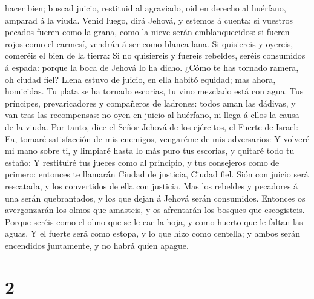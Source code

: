 hacer bien; buscad juicio, restituid al agraviado, oid en derecho al
huérfano, amparad á la viuda.  Venid luego, dirá Jehová,
y estemos á cuenta: si vuestros pecados fueren como la grana, como la
nieve serán emblanquecidos: si fueren rojos como el carmesí, vendrán á
ser como blanca lana.  Si quisiereis y oyereis, comeréis
el bien de la tierra:  Si no quisiereis y fuereis
rebeldes, seréis consumidos á espada: porque la boca de Jehová lo ha
dicho.  ¿Cómo te has tornado ramera, oh ciudad fiel?
Llena estuvo de juicio, en ella habitó equidad; mas ahora, homicidas.
 Tu plata se ha tornado escorias, tu vino mezclado está
con agua.  Tus príncipes, prevaricadores y compañeros de
ladrones: todos aman las dádivas, y van tras las recompensas: no oyen en
juicio al huérfano, ni llega á ellos la causa de la viuda.
 Por tanto, dice el Señor Jehová de los ejércitos, el
Fuerte de Israel: Ea, tomaré satisfacción de mis enemigos, vengaréme de
mis adversarios:  Y volveré mi mano sobre ti, y limpiaré
hasta lo más puro tus escorias, y quitaré todo tu estaño:
 Y restituiré tus jueces como al principio, y tus
consejeros como de primero: entonces te llamarán Ciudad de justicia,
Ciudad fiel.  Sión con juicio será rescatada, y los
convertidos de ella con justicia.  Mas los rebeldes y
pecadores á una serán quebrantados, y los que dejan á Jehová serán
consumidos.  Entonces os avergonzarán los olmos que
amasteis, y os afrentarán los bosques que escogisteis. 
Porque seréis como el olmo que se le cae la hoja, y como huerto que le
faltan las aguas.  Y el fuerte será como estopa, y lo que
hizo como centella; y ambos serán encendidos juntamente, y no habrá
quien apague.

\hypertarget{section-1}{%
\section{2}\label{section-1}}

